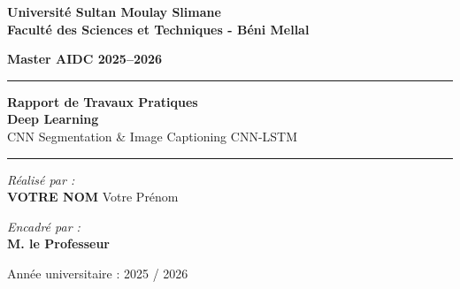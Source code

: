 \documentclass[12pt, a4paper]{article}
\begin{document}
\begin{titlepage}
    \centering
    \vspace*{0.5cm}
    
    {\Large \textbf{Université Sultan Moulay Slimane}}\\
    \vspace{0.2cm}
    {\large \textbf{Faculté des Sciences et Techniques - Béni Mellal}}\\
    \vspace{2cm}
    
    {\Large \textbf{Master AIDC 2025–2026}}\\
    \vspace{2cm}
    
    \rule{\textwidth}{1pt}
    \vspace{0.6cm}
    {\huge \textbf{Rapport de Travaux Pratiques}}\\
    \vspace{0.4cm}
    {\Large \textbf{Deep Learning}}\\
    \vspace{0.3cm}
    {\large CNN Segmentation \& Image Captioning CNN-LSTM}\\
    \vspace{0.4cm}
    \rule{\textwidth}{1pt}
    
    \vspace{3cm}
    
    \begin{minipage}{0.4\textwidth}
        \begin{flushleft} \large
            \emph{Réalisé par :}\\
            \textbf{VOTRE NOM} Votre Prénom %
        \end{flushleft}
    \end{minipage}
    \hfill
    \begin{minipage}{0.4\textwidth}
        \begin{flushright} \large
            \emph{Encadré par :} \\
            \textbf{M. le Professeur} %
        \end{flushright}
    \end{minipage}
    
    \vfill
    
    {\normalsize Année universitaire : 2025 / 2026}
\end{titlepage}
\end{document}
